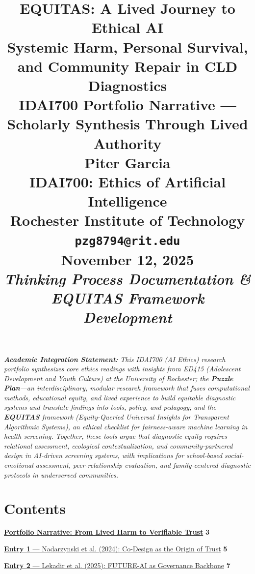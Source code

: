 \documentclass[11pt,twoside]{article}
\title{
\vspace*{1.5in}
\textbf{\Huge EQUITAS: A Lived Journey to Ethical AI}\\[0.5em]
\Large Systemic Harm, Personal Survival, and Community Repair in CLD Diagnostics\\[1.5em]
\large IDAI700 Portfolio Narrative --- Scholarly Synthesis Through Lived Authority\\[2em]
\vfill
\Large \textbf{Piter Garcia}\\
\normalsize IDAI700: Ethics of Artificial Intelligence\\
Rochester Institute of Technology\\
\texttt{pzg8794@rit.edu}\\[1em]
\large \textbf{November 12, 2025}\\
\normalsize \textit{Thinking Process Documentation \& EQUITAS Framework Development}
}
\author{}
\date{}
\begin{document}
\thispagestyle{empty}

\maketitle

\vspace{0.5in}

\noindent\textit{\tiny\textbf{Academic Integration Statement:}
This IDAI700 (AI Ethics) research portfolio synthesizes core ethics readings with insights from ED415 (Adolescent Development and Youth Culture) at the University of Rochester; the \textbf{Puzzle Plan}---an interdisciplinary, modular research framework that fuses computational methods, educational equity, and lived experience to build equitable diagnostic systems and translate findings into tools, policy, and pedagogy; and the \textbf{EQUITAS} framework (Equity-Queried Universal Insights for Transparent Algorithmic Systems), an ethical checklist for fairness-aware machine learning in health screening. Together, these tools argue that \emph{diagnostic equity requires relational assessment, ecological contextualization, and community-partnered design} in AI-driven screening systems, with implications for school-based social-emotional assessment, peer-relationship evaluation, and family-centered diagnostic protocols in underserved communities.}

\newpage

\thispagestyle{empty}

\section*{Contents}

\vspace{0.5cm}

\noindent\hyperref[sec:narrative]{\textbf{Portfolio Narrative: From Lived Harm to Verifiable Trust}} \dotfill \textbf{3}

\vspace{0.3cm}

\noindent\hyperref[entry1]{\textbf{Entry 1} --- Nadarzynski et al. (2024): Co-Design as the Origin of Trust} \dotfill \textbf{5}

\vspace{0.15cm}

\noindent\hyperref[entry2]{\textbf{Entry 2} --- Lekadir et al. (2025): FUTURE-AI as Governance Backbone} \dotfill \textbf{7}

\vspace{0.15cm}
\end{document}
